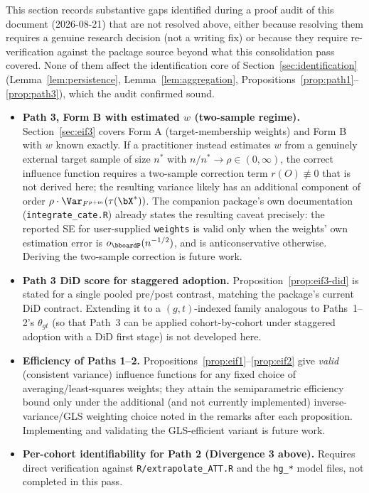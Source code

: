 \documentclass{article}
\renewcommand{\P}{\bboardP}
\begin{document}
This section records substantive gaps identified during a proof audit of this document (2026-08-21) that are not resolved above, either because resolving them requires a genuine research decision (not a writing fix) or because they require re-verification against the package source beyond what this consolidation pass covered. None of them affect the identification core of Section~\ref{sec:identification} (Lemma~\ref{lem:persistence}, Lemma~\ref{lem:aggregation}, Propositions~\ref{prop:path1}--\ref{prop:path3}), which the audit confirmed sound.

\begin{itemize}
\item \textbf{Path 3, Form B with estimated $w$ (two-sample regime).} Section~\ref{sec:eif3} covers Form A (target-membership weights) and Form B with $w$ known exactly. If a practitioner instead estimates $w$ from a genuinely external target sample of size $n^*$ with $n/n^*\to\rho\in(0,\infty)$, the correct influence function requires a two-sample correction term $r(O)\not\equiv0$ that is not derived here; the resulting variance likely has an additional component of order $\rho\cdot\Var_{F^{p+m}}(\tau(\bX^*))$. The companion package's own documentation (\texttt{integrate\_cate.R}) already states the resulting caveat precisely: the reported SE for user-supplied \texttt{weights} is valid only when the weights' own estimation error is $o_\P(n^{-1/2})$, and is anticonservative otherwise. Deriving the two-sample correction is future work.
\item \textbf{Path 3 DiD score for staggered adoption.} Proposition~\ref{prop:eif3-did} is stated for a single pooled pre/post contrast, matching the package's current DiD contract. Extending it to a $(g,t)$-indexed family analogous to Paths~1--2's $\theta_{gt}$ (so that Path~3 can be applied cohort-by-cohort under staggered adoption with a DiD first stage) is not developed here.
\item \textbf{Efficiency of Paths 1--2.} Propositions~\ref{prop:eif1}--\ref{prop:eif2} give \emph{valid} (consistent variance) influence functions for any fixed choice of averaging/least-squares weights; they attain the semiparametric efficiency bound only under the additional (and not currently implemented) inverse-variance/GLS weighting choice noted in the remarks after each proposition. Implementing and validating the GLS-efficient variant is future work.
\item \textbf{Per-cohort identifiability for Path 2 (Divergence 3 above).} Requires direct verification against \texttt{R/extrapolate\_ATT.R} and the \texttt{hg\_*} model files, not completed in this pass.

\end{itemize}
\end{document}
